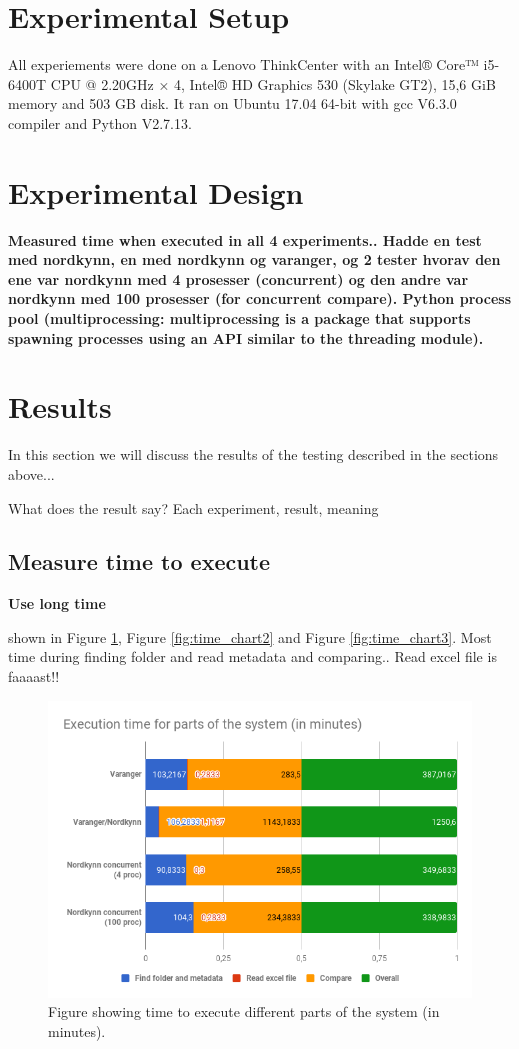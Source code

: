 \documentclass[USenglish]{uit-thesis}
\begin{document}
\section{Experimental Setup}
All experiements were done on a Lenovo ThinkCenter with an Intel® Core™ i5-6400T CPU @ 2.20GHz × 4, Intel® HD Graphics 530 (Skylake GT2), 15,6 GiB memory and 503 GB disk. It ran on Ubuntu 17.04 64-bit with gcc V6.3.0 compiler and Python V2.7.13.

\section{Experimental Design}
\textbf{Measured time when executed in all 4 experiments.. Hadde en test med nordkynn, en med nordkynn og varanger, og 2 tester hvorav den ene var nordkynn med 4 prosesser (concurrent) og den andre var nordkynn med 100 prosesser (for concurrent compare). Python process pool (multiprocessing: multiprocessing is a package that supports spawning processes using an API similar to the threading module).}


\section{Results}
In this section we will discuss the results of the testing described in the sections above...

What does the result say?
Each experiment, result, meaning

\subsection{Measure time to execute}
\textbf{Use long time}

shown in Figure \ref{fig:time_chart}, Figure \ref{fig:time_chart2} and Figure \ref{fig:time_chart3}.
Most time during finding folder and read metadata and comparing.. Read excel file is faaaast!!

\begin{figure}
\centering
\includegraphics[width=\textwidth]{chart.png}
\caption{Figure showing time to execute different parts of the system (in minutes).}
\label{fig:time_chart}
\end{figure}
\end{document}
